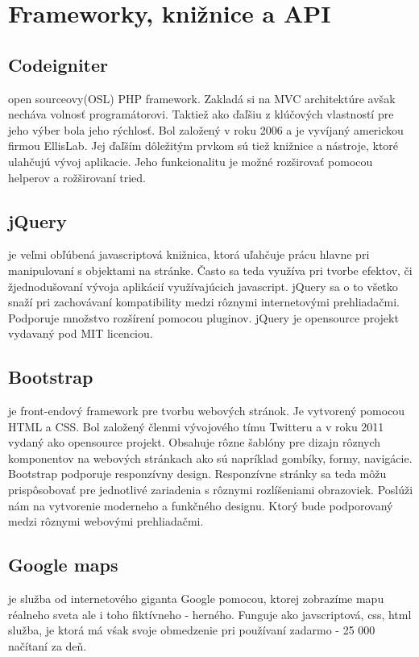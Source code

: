 \section{Frameworky, knižnice a API}

\subsection{Codeigniter} open sourceovy(OSL) PHP framework. Zakladá si na MVC architektúre avšak necháva volnosť programátorovi. Taktiež ako ďaľšiu z klúčových vlastností pre jeho výber bola jeho rýchlosť\cite{codeigniter-guide}. Bol založený v roku 2006 a je vyvíjaný americkou firmou EllisLab. Jej ďaľším dôležitým prvkom sú tiež knižnice a nástroje, ktoré ulahčujú vývoj aplikacie. Jeho funkcionalitu je možné rozširovať pomocou helperov a rožširovaní tried.

\subsection{jQuery} je veľmi obľúbená\cite{jquery-usage} javascriptová knižnica, ktorá uľahčuje prácu hlavne pri manipulovaní s objektami na stránke. Často sa teda využíva pri tvorbe efektov, či žjednodušovaní vývoja aplikácií využívajúcich javascript. jQuery sa o to všetko snaží pri zachovávaní kompatibility medzi rôznymi internetovými prehliadačmi\cite{jquery-browsers}. Podporuje množstvo rozšírení pomocou pluginov\cite{jquery-plugins}. jQuery je opensource projekt vydavaný pod MIT licenciou. 

\subsection{Bootstrap} je front-endový framework pre tvorbu webových stránok. Je vytvorený pomocou HTML a CSS. Bol založený členmi vývojového tímu Twitteru a v roku 2011 vydaný ako opensource projekt\cite{bootstrap-about}. Obsahuje rôzne šablóny pre dizajn rôznych komponentov na webových stránkach ako sú napríklad gombíky, formy, navigácie. Bootstrap podporuje responzívny design. Responzívne stránky sa teda môžu prispôsobovať pre jednotlivé zariadenia s rôznymi rozlíšeniami obrazoviek. Poslúži nám na vytvorenie moderneho a funkčného designu. Ktorý bude podporovaný medzi rôznymi webovými prehliadačmi.


\subsection{Google maps} je služba od internetového giganta Google pomocou, ktorej zobrazíme mapu réalneho sveta ale i toho fiktívneho - herného. Funguje ako javscriptová, css, html služba, je ktorá má vśak svoje obmedzenie pri používaní zadarmo - 25 000 načítaní za deň\cite{gmaps-usage}.


